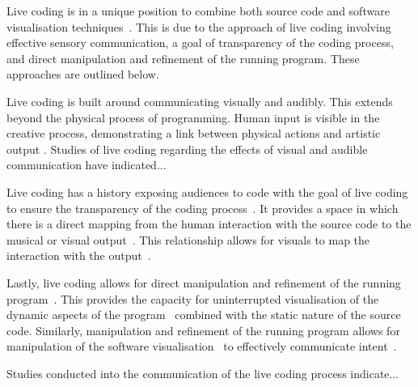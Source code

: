 Live coding is in a unique position to combine both source code and software visualisation techniques~\cite{McLean2010a}. This is due to the approach of live coding involving effective sensory communication, a goal of transparency of the coding process, and direct manipulation and refinement of the running program. These approaches are outlined below.

Live coding is built around communicating visually and audibly. This extends beyond the physical process of programming. Human input is visible in the creative process, demonstrating a link between physical actions and artistic output \cite{Mclean}. Studies of live coding regarding the effects of visual and audible communication have indicated...

Live coding has a history exposing audiences to code with the goal of live coding to ensure the transparency of the coding process~\cite{Collins2011,McLean2010a}. It provides a space in which there is a direct mapping from the human interaction with the source code to the musical or visual output~\cite{Mclean}. This relationship allows for visuals to map the interaction with the output~.

Lastly, live coding allows for direct manipulation and refinement of the running program~\cite{Swift2013}. This provides the capacity for uninterrupted visualisation of the dynamic aspects of the program~ combined with the static nature of the source code. Similarly, manipulation and refinement of the running program allows for manipulation of the software visualisation~\cite{McLean2010a} to effectively communicate intent~.

Studies conducted into the communication of the live coding process indicate...




